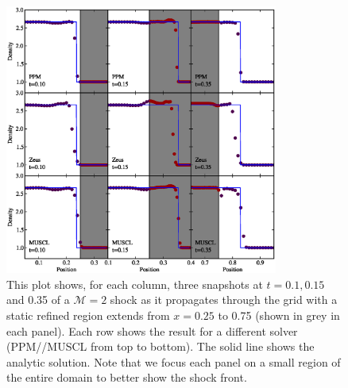 \begin{figure}
\begin{center}
\includegraphics[width=0.8\textwidth]{figures/ShockPool}
\caption{This plot shows, for each column, three snapshots at $t=0.1, 0.15$ and 0.35 of a $\mathcal{M}=2$ shock as it propagates through the grid with a static refined region extends from $x = 0.25$ to 0.75 (shown in grey in each panel).   Each row shows the result for a different solver (PPM/\zeus/MUSCL from top to bottom).  The solid line shows the analytic solution.  Note that we focus each panel on a small region of the entire domain to better show the shock front.}
\label{fig.shockpool}
\end{center}
\end{figure}
